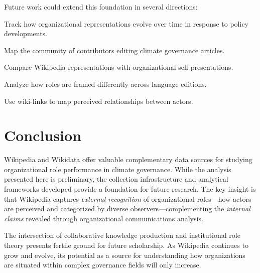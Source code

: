 Future work could extend this foundation in several directions:

\begin{kaobox}[frametitle=Research Extensions]
\begin{description}[leftmargin=*]
    \item[Revision history analysis] Track how organizational representations evolve over time in response to policy developments.
    \item[Editor network analysis] Map the community of contributors editing climate governance articles.
    \item[Cross-platform comparison] Compare Wikipedia representations with organizational self-presentations.
    \item[Multilingual role framing] Analyze how roles are framed differently across language editions.
    \item[Link network analysis] Use wiki-links to map perceived relationships between actors.
\end{description}
\end{kaobox}

\section{Conclusion}

Wikipedia and Wikidata offer valuable complementary data sources for studying organizational role performance in climate governance. While the analysis presented here is preliminary, the collection infrastructure and analytical frameworks developed provide a foundation for future research. The key insight is that Wikipedia captures \emph{external recognition} of organizational roles---how actors are perceived and categorized by diverse observers---complementing the \emph{internal claims} revealed through organizational communications analysis.

The intersection of collaborative knowledge production and institutional role theory presents fertile ground for future scholarship. As Wikipedia continues to grow and evolve, its potential as a source for understanding how organizations are situated within complex governance fields will only increase.

